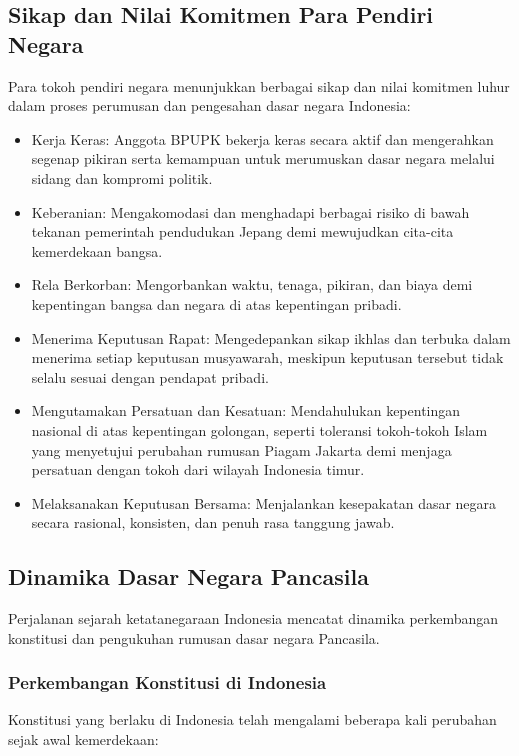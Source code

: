 \subsection{Sikap dan Nilai Komitmen Para Pendiri Negara}

Para tokoh pendiri negara menunjukkan berbagai sikap dan nilai komitmen luhur dalam proses perumusan dan pengesahan dasar negara Indonesia:

\begin{itemize}
\item Kerja Keras: Anggota BPUPK bekerja keras secara aktif dan mengerahkan segenap pikiran serta kemampuan untuk merumuskan dasar negara melalui sidang dan kompromi politik.
\item Keberanian: Mengakomodasi dan menghadapi berbagai risiko di bawah tekanan pemerintah pendudukan Jepang demi mewujudkan cita-cita kemerdekaan bangsa.
\item Rela Berkorban: Mengorbankan waktu, tenaga, pikiran, dan biaya demi kepentingan bangsa dan negara di atas kepentingan pribadi.
\item Menerima Keputusan Rapat: Mengedepankan sikap ikhlas dan terbuka dalam menerima setiap keputusan musyawarah, meskipun keputusan tersebut tidak selalu sesuai dengan pendapat pribadi.
\item Mengutamakan Persatuan dan Kesatuan: Mendahulukan kepentingan nasional di atas kepentingan golongan, seperti toleransi tokoh-tokoh Islam yang menyetujui perubahan rumusan Piagam Jakarta demi menjaga persatuan dengan tokoh dari wilayah Indonesia timur.
\item Melaksanakan Keputusan Bersama: Menjalankan kesepakatan dasar negara secara rasional, konsisten, dan penuh rasa tanggung jawab.
\end{itemize}

\subsection{Dinamika Dasar Negara Pancasila}

Perjalanan sejarah ketatanegaraan Indonesia mencatat dinamika perkembangan konstitusi dan pengukuhan rumusan dasar negara Pancasila.

\subsubsection{Perkembangan Konstitusi di Indonesia}

Konstitusi yang berlaku di Indonesia telah mengalami beberapa kali perubahan sejak awal kemerdekaan:

